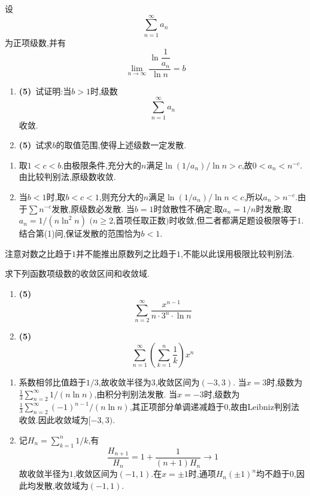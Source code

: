 \documentclass{ctexart}
\begin{document}
\begin{problem}[3.(10\songti{分})]
设
        \[\sum_{n=1}^{\infty}a_n\]
        为正项级数,并有
        \[\lim_{n\to\infty}\dfrac{\ln\dfrac{1}{a_n}}{\ln n}=b\]
        \begin{enumerate}[label=\tbf{(\arabic*)},topsep=0pt,parsep=0pt,itemsep=0pt,partopsep=0pt]
            \item \textbf{(5)}\ 试证明:当$b>1$时,级数
                \[\sum_{n=1}^{\infty}a_n\]
                收敛.
            \item \textbf{(5)}\ 试求$b$的取值范围,使得上述级数一定发散.
        \end{enumerate}
\end{problem}
\begin{solution}
\begin{enumerate}[label=\tbf{(\arabic*)},topsep=0pt,parsep=0pt,itemsep=0pt,partopsep=0pt]
\item 取$1<c<b$.由极限条件,充分大的$n$满足$\ln(1/a_n)/\ln n>c$,故$0<a_n<n^{-c}$.由比较判别法,原级数收敛.
\item 当$b<1$时,取$b<c<1$,则充分大的$n$满足$\ln(1/a_n)/\ln n<c$,所以$a_n>n^{-c}$.由于$\sum n^{-c}$发散,原级数必发散.
当$b=1$时敛散性不确定:取$a_n=1/n$时发散;取$a_n=1/(n\ln^2n)$ $(n\geqslant2$,首项任取正数$)$时收敛,但二者都满足题设极限等于$1$.
结合第(1)问,保证发散的范围恰为$b<1$.
\end{enumerate}
注意对数之比趋于$1$并不能推出原数列之比趋于$1$,不能以此误用极限比较判别法.
\end{solution}

\begin{problem}[4.(10\songti{分})]
求下列函数项级数的收敛区间和收敛域.
        \begin{enumerate}[label=\tbf{(\arabic*)},topsep=0pt,parsep=0pt,itemsep=0pt,partopsep=0pt]
            \item \textbf{(5)}\ 
                \[\sum_{n=2}^{\infty}\dfrac{x^{n-1}}{n\cdot3^n\cdot\ln n}\]
            \item \textbf{(5\songti{分})}\ 
                \[\sum_{n=1}^{\infty}\left(\sum_{k=1}^{n}\dfrac{1}{k}\right)x^n\]

        \end{enumerate}
\end{problem}
\begin{solution}
\begin{enumerate}[label=\tbf{(\arabic*)},topsep=0pt,parsep=0pt,itemsep=0pt,partopsep=0pt]
\item 系数相邻比值趋于$1/3$,故收敛半径为$3$,收敛区间为$(-3,3)$.
当$x=3$时,级数为$\frac13\sum_{n=2}^{\infty}1/(n\ln n)$,由积分判别法发散.
当$x=-3$时,级数为$\frac13\sum_{n=2}^{\infty}(-1)^{n-1}/(n\ln n)$,其正项部分单调递减趋于$0$,故由Leibniz判别法收敛.因此收敛域为$[-3,3)$.
\item 记$H_n=\sum_{k=1}^n1/k$,有
\[\frac{H_{n+1}}{H_n}=1+\frac1{(n+1)H_n}\to1\]
故收敛半径为$1$,收敛区间为$(-1,1)$.在$x=\pm1$时,通项$H_n(\pm1)^n$均不趋于$0$,因此均发散,收敛域为$(-1,1)$.
\end{enumerate}
\end{solution}
\end{document}
